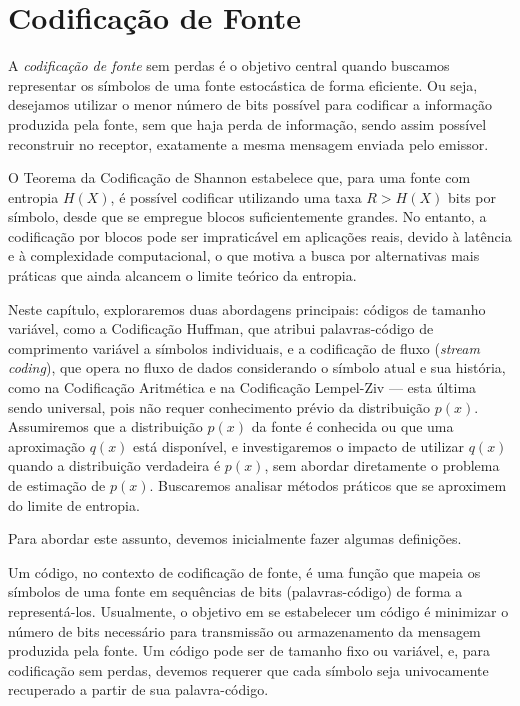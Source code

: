 \chapter{Codificação de Fonte}

A \emph{codificação de fonte} sem perdas é o objetivo central quando
buscamos representar os símbolos de uma fonte estocástica de forma eficiente.
Ou seja, desejamos utilizar o menor número de bits possível para
codificar a informação produzida pela fonte, sem que haja perda de informação,
sendo assim possível reconstruir no receptor, exatamente a mesma mensagem
enviada pelo emissor.

O Teorema da Codificação de Shannon estabelece que, para uma fonte com entropia
$H(X)$, é possível codificar utilizando uma taxa $R > H(X)$ bits por símbolo,
desde que se empregue blocos suficientemente grandes. No entanto, a codificação
por blocos pode ser impraticável em aplicações reais, devido à latência e à
complexidade computacional, o que motiva a busca por alternativas mais práticas
que ainda alcancem o limite teórico da entropia.

Neste capítulo, exploraremos duas abordagens principais: códigos de tamanho
variável, como a Codificação Huffman, que atribui palavras-código de
comprimento variável a símbolos individuais, e a codificação de fluxo
(\textit{stream coding}), que opera no fluxo de dados considerando o símbolo
atual e sua história, como na Codificação Aritmética e na Codificação
Lempel-Ziv --- esta última sendo universal, pois não requer conhecimento prévio
da distribuição $p(x)$. Assumiremos que a distribuição $p(x)$ da fonte é
conhecida ou que uma aproximação $q(x)$ está disponível, e investigaremos o
impacto de utilizar $q(x)$ quando a distribuição verdadeira é $p(x)$, sem
abordar diretamente o problema de estimação de $p(x)$. Buscaremos
analisar métodos práticos que se aproximem do limite de entropia.

Para abordar este assunto, devemos inicialmente fazer algumas definições.

Um código, no contexto de codificação de fonte, é uma função que mapeia os
símbolos de uma fonte em sequências de bits (palavras-código) de forma a
representá-los. Usualmente, o objetivo em se estabelecer um código é minimizar
o número de bits necessário para transmissão ou armazenamento da mensagem
produzida pela fonte. Um código pode ser de tamanho fixo ou variável, e, para
codificação sem perdas, devemos requerer que cada símbolo seja
univocamente recuperado a partir de sua palavra-código.

